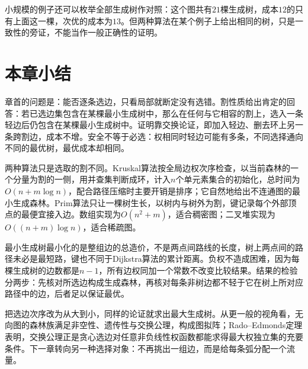 小规模的例子还可以枚举全部生成树作对照：这个图共有$21$棵生成树，成本$12$的只有上面这一棵，次优的成本为$13$。但两种算法在某个例子上给出相同的树，只是一致性的旁证，不能当作一般正确性的证明。

\FloatBarrier
\section{本章小结}
\label{sec:mst-summary}

章首的问题是：能否逐条选边，只看局部就断定没有选错。割性质给出肯定的回答：若已选边集包含在某棵最小生成树中，那么在任何与它相容的割上，选入一条轻边后仍包含在某棵最小生成树中。证明靠交换论证，即加入轻边、删去环上另一条跨割边，成本不增。安全不等于必选：权相同时轻边可能有多条，不同选择通向不同的最优树，最优成本却相同。

两种算法只是选取的割不同。Kruskal算法按全局边权次序检查，以当前森林的一个分量为割的一侧，用并查集判断成环，计入$n$个单元素集合的初始化，总时间为$O(n+m\log n)$，配合路径压缩时主要开销是排序；它自然地给出不连通图的最小生成森林。Prim算法只让一棵树生长，以树内与树外为割，键记录每个外部顶点的最便宜接入边。数组实现为$O(n^2+m)$，适合稠密图；二叉堆实现为$O((n+m)\log n)$，适合稀疏图。

最小生成树最小化的是整组边的总造价，不是两点间路线的长度，树上两点间的路径未必是最短路，键也不同于Dijkstra算法的累计距离。负权不造成困难，因为每棵生成树的边数都是$n-1$，所有边权同加一个常数不改变比较结果。结果的检验分两步：先核对所选边构成生成森林，再核对每条非树边都不轻于它在树上所对应路径中的边，后者足以保证最优。

把选边次序改为从大到小，同样的论证就求出最大生成树。从更一般的视角看，无向图的森林族满足非空性、遗传性与交换公理，构成图拟阵；Rado--Edmonds定理表明，交换公理正是贪心选边对任意非负线性权函数都能求得最大权独立集的充要条件。下一章转向另一种选择对象：不再挑出一组边，而是给每条弧分配一个流量。

